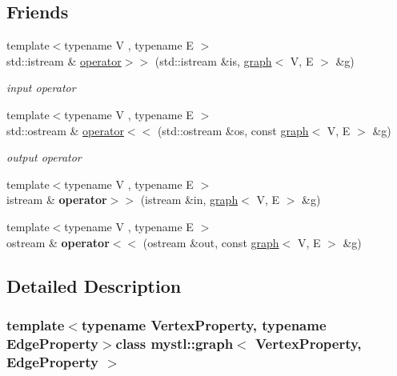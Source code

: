\subsection*{Friends}
\begin{DoxyCompactItemize}
\item 
{\footnotesize template$<$typename V , typename E $>$ }\\std\+::istream \& \hyperlink{classmystl_1_1graph_aa5e68654c5943df7ebbc1bd6e9312121}{operator$>$$>$} (std\+::istream \&is, \hyperlink{classmystl_1_1graph}{graph}$<$ V, E $>$ \&g)
\begin{DoxyCompactList}\small\item\em input operator \end{DoxyCompactList}\item 
{\footnotesize template$<$typename V , typename E $>$ }\\std\+::ostream \& \hyperlink{classmystl_1_1graph_a9d5de7fa26f6baa171baa2700f707061}{operator$<$$<$} (std\+::ostream \&os, const \hyperlink{classmystl_1_1graph}{graph}$<$ V, E $>$ \&g)
\begin{DoxyCompactList}\small\item\em output operator \end{DoxyCompactList}\item 
\hypertarget{classmystl_1_1graph_a704c337be3ef404f576c510e45b3b150}{{\footnotesize template$<$typename V , typename E $>$ }\\istream \& {\bfseries operator$>$$>$} (istream \&in, \hyperlink{classmystl_1_1graph}{graph}$<$ V, E $>$ \&g)}\label{classmystl_1_1graph_a704c337be3ef404f576c510e45b3b150}

\item 
\hypertarget{classmystl_1_1graph_a2887971cf454be5bc66778aff744406d}{{\footnotesize template$<$typename V , typename E $>$ }\\ostream \& {\bfseries operator$<$$<$} (ostream \&out, const \hyperlink{classmystl_1_1graph}{graph}$<$ V, E $>$ \&g)}\label{classmystl_1_1graph_a2887971cf454be5bc66778aff744406d}

\end{DoxyCompactItemize}


\subsection{Detailed Description}
\subsubsection*{template$<$typename Vertex\+Property, typename Edge\+Property$>$class mystl\+::graph$<$ Vertex\+Property, Edge\+Property $>$}

